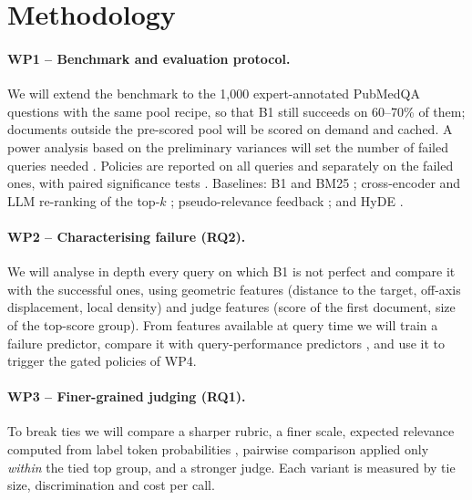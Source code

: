 
\section{Methodology}

\paragraph{WP1 -- Benchmark and evaluation protocol.}
We will extend the benchmark to the 1,000 expert-annotated PubMedQA questions with the same pool recipe, so that B1 still succeeds on 60--70\% of them; documents outside the pre-scored pool will be scored on demand and cached. A power analysis based on the preliminary variances will set the number of failed queries needed \citep{sakai2016statistical}. Policies are reported on all queries and separately on the failed ones, with paired significance tests \citep{smucker2007comparison}. Baselines: B1 and BM25 \citep{robertson2009bm25}; cross-encoder and LLM re-ranking of the top-$k$ \citep{nogueira2019passage,sun2023rankgpt}; pseudo-relevance feedback \citep{rocchio1971relevance,yu2021anceprf}; and HyDE \citep{gao2023hyde}.

\paragraph{WP2 -- Characterising failure (RQ2).}
We will analyse in depth every query on which B1 is not perfect and compare it with the successful ones, using geometric features (distance to the target, off-axis displacement, local density) and judge features (score of the first document, size of the top-score group). From features available at query time we will train a failure predictor, compare it with query-performance predictors \citep{carmel2010estimating}, and use it to trigger the gated policies of WP4.

\paragraph{WP3 -- Finer-grained judging (RQ1).}
To break ties we will compare a sharper rubric, a finer scale, expected relevance computed from label token probabilities \citep{zhuang2024beyond}, pairwise comparison applied only \emph{within} the tied top group, and a stronger judge. Each variant is measured by tie size, discrimination and cost per call.

